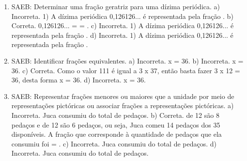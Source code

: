 \begin{enumerate}
\item
SAEB: Determinar uma fração geratriz para uma dízima periódica.
a) Incorreta. 1)  A dízima periódica 0,126126... é representada pela 
fração .
b) Correta. 0,126126... =  = .
c)  Incorreta. 1)  A dízima periódica 0,126126... é representada pela 
fração .
d)  Incorreta. 1)  A dízima periódica 0,126126... é representada pela 
fração .

\item
SAEB: Identificar frações equivalentes.
a) Incorreta. x = 36.
b) Incorreta. x = 36.
c) Correta. Como o valor 111 é igual a 3 x 37, então basta fazer 
3 x 12 = 36, desta forma x = 36.
d) Incorreta. x = 36.

\item
SAEB: Representar frações menores ou maiores que a unidade por 
meio de representações pictóricas ou associar frações a representações 
pictóricas.
a) Incorreta. Juca consumiu  do total de pedaços. 
b) Correta.  de 12 são 8 pedaços e  de 12 são 6
pedaços, ou seja, Juca comeu 14 pedaços dos 35 disponíveis. A fração que
corresponde à quantidade de pedaços que ela consumiu foi  
= .
c) Incorreta. Juca consumiu  do total de pedaços.
d) Incorreta. Juca consumiu  do total de pedaços.
\end{enumerate}


